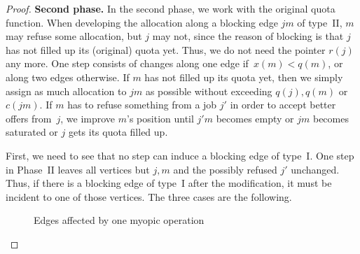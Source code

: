 \documentclass{llncs}
\begin{document}
\begin{proof}
\textbf{Second phase.}
In the second phase, we work with the original quota function. When developing the allocation along a blocking edge $jm$ of type~II, $m$ may refuse some allocation, but $j$ may not, since the reason of blocking is that $j$ has not filled up its (original) quota yet. Thus, we do not need the pointer $r(j)$ any more. One step consists of changes along one edge if~$x(m) < q(m)$, or along two edges otherwise. If $m$ has not filled up its quota yet, then we simply assign as much allocation to $jm$ as possible without exceeding $q(j), q(m)$ or~$c(jm)$. If $m$ has to refuse something from a job $j'$ in order to accept better offers from~$j$, we improve $m$'s position until $j'm$ becomes empty or $jm$ becomes saturated or $j$ gets its quota filled up.

First, we need to see that no step can induce a blocking edge of type~I. One step in Phase~II leaves all vertices but $j,m$ and the possibly refused $j'$ unchanged. Thus, if there is a blocking edge of type~I after the modification, it must be incident to one of those vertices. The three cases are the following.
\begin{figure}[H]
\begin{center}
\end{center}
\caption{Edges affected by one myopic operation}
\end{figure}


\end{proof}
\end{document}
